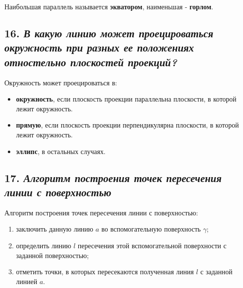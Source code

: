 Наибольшая параллель называется {\bf экватором}, наименьшая - {\bf горлом}.



\newpage
\subsection*{16. \textit{В какую линию может проецироваться окружность при разных ее положениях отностельно плоскостей проекций?}}

\begin{mainQuote}
\end{mainQuote}
Окружность может проецироваться в:
\begin{itemize}
    \item {\bf окружность}, если плоскость проекции параллельна плоскости, в которой лежит окружность.
    \item {\bf прямую}, если плоскость проекции перпендикулярна плоскости, в которой лежит окружность.
    \item {\bf эллипс}, в остальных случаях.
\end{itemize}



\newpage
\subsection*{17. \textit{Алгоритм построения точек пересечения линии с поверхностью}}

\begin{mainQuote}
\end{mainQuote}
Алгоритм построения точек пересечения линии с поверхностью:
\begin{enumerate}
    \item заключить данную линию $a$ во вспомогательную поверхность $\gamma$;
    \item определить линию $l$ пересечения этой вспомогательной поверхности с заданной поверхностью;
    \item отметить точки, в которых пересекаются полученная линия $l$ с заданной линией $a$.
\end{enumerate}


